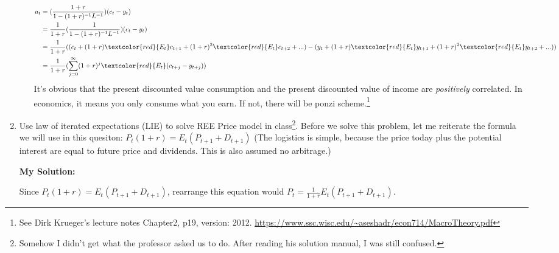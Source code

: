 \documentclass[11pt]{article} %
\begin{document}
\begin{enumerate}
\begin{enumerate}
\begin{align*}
                 a_t&=(\frac{1+r}{1-(1+r)^{-1}L^{-1}})(c_t-y_t)\\
                 &= \frac{1}{1+r}(\frac{1}{1-(1+r)^{-1}L^{-1}})(c_t-y_t)\\
                 &= \frac{1}{1+r}((c_t+(1+r)\textcolor{red}{E_t}c_{t+1}+(1+r)^2\textcolor{red}{E_t}c_{t+2}+...)-(y_t+(1+r)\textcolor{red}{E_t}y_{t+1}+(1+r)^2\textcolor{red}{E_t}y_{t+2}+...))\\
                 &= \frac{1}{1+r}(\sum_{j=0}^\infty (1+r)^j\textcolor{red}{E_t}(c_{t+j}-y_{t+j}))
             \end{align*}
             It's obvious that the present discounted value consumption and the present discounted value of income are \textit{positively} correlated. 
             In economics, it means you only consume what you earn. If not, there will be ponzi scheme.\footnote{See Dirk Krueger's lecture notes Chapter2, p19, version: 2012. \url{https://www.ssc.wisc.edu/~aseshadr/econ714/MacroTheory.pdf} }
    \end{enumerate}
    \item Use law of iterated expectations (LIE) to solve REE Price model in class\footnote{Somehow I didn't get what the professor asked us to do. After reading his solution manual, I was still confused.}. Before we solve this problem, let me reiterate the formula we will use in this quesiton:
         $P_t(1+r)=E_t(P_{t+1}+D_{t+1})$ (The logistics is simple, because the price today plus the potential interest are equal to future price and dividends. This is also assumed no arbitrage.)
         
         \textbf{My Solution:}
        
         Since $P_t(1+r)=E_t(P_{t+1}+D_{t+1})$, rearrange this equation would
        $P_t=\frac{1}{1+r}E_t(P_{t+1}+D_{t+1})$. 
        

\end{enumerate}
\end{document}
